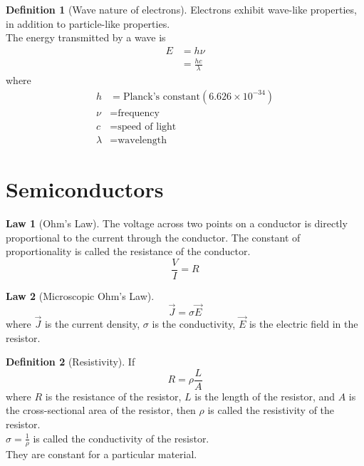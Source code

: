 \documentclass[fleqn, a4paper, 12pt, twoside]{article}
\theoremstyle{definition}
\newtheorem{definition}{Definition}
\theoremstyle{theorem}
\newtheorem{law}{Law}
\begin{document}
\begin{definition}[Wave nature of electrons]
	Electrons exhibit wave-like properties, in addition to particle-like properties.\\
	The energy transmitted by a wave is
	\begin{align*}
		E & = h \nu \\
                  & = \frac{h c}{\lambda}
	\end{align*}
	where
	\begin{align*}
		h       & = \text{Planck's constant} \left( 6.626 \times 10^{-34} \right) \\
		\nu     & = \text{frequency}                                              \\
		c       & = \text{speed of light}                                         \\
		\lambda & = \text{wavelength}
	\end{align*}
\end{definition}

\section{Semiconductors}

\begin{law}[Ohm's Law]
	The voltage across two points on a conductor is directly proportional to the current through the conductor.
	The constant of proportionality is called the resistance of the conductor.
	\begin{equation*}
		\frac{V}{I} = R
	\end{equation*}
	\label{Ohm's_Law}
\end{law}

\begin{law}[Microscopic Ohm's Law]
	\begin{equation*}
		\overrightarrow{J}  = \sigma \overrightarrow{E}
	\end{equation*}
	where $\overrightarrow{J}$ is the current density, $\sigma$ is the conductivity, $\overrightarrow{E}$ is the electric field in the resistor.
	\label{Microscopic_Ohm's_Law}
\end{law}

\begin{definition}[Resistivity]
	If
	\begin{equation*}
		R = \rho \frac{L}{A}
	\end{equation*}
	where $R$ is the resistance of the resistor, $L$ is the length of the resistor, and $A$ is the cross-sectional area of the resistor, then $\rho$ is called the resistivity of the resistor.\\
	$\sigma = \frac{1}{\rho}$ is called the conductivity of the resistor.\\
	They are constant for a particular material.
\end{definition}
\end{document}
